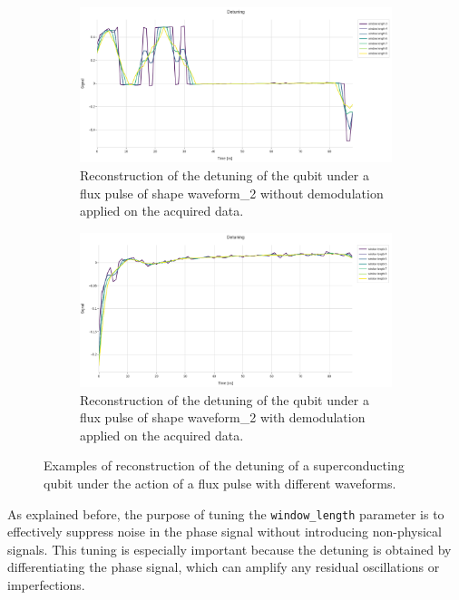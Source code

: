 \begin{figure}[h!]
    \begin{subfigure}[t]{0.45\textwidth}
        \includegraphics[width=\textwidth]{figures/png/Cryoscope/no_demod/long/detuning_windows.png}
        \caption{Reconstruction of the detuning of the qubit under a flux pulse of shape waveform\_2 without demodulation applied on the acquired data.}
        \label{fig:detuning:long_no_dem}
    \end{subfigure}
    \hfill
    \begin{subfigure}[t]{0.45\textwidth}
        \includegraphics[width=\textwidth]{figures/png/Cryoscope/demodulation/long/detuning_windows.png}
        \caption{Reconstruction of the detuning of the qubit under a flux pulse of shape waveform\_2 with demodulation applied on the acquired data.}
        \label{fig:detuning:long_dem}
    \end{subfigure}

    \caption{Examples of reconstruction of the detuning of a superconducting qubit under the action of a flux pulse with different waveforms.}
    \label{fig:detuning}
\end{figure}

As explained before, the purpose of tuning the \texttt{window\_length} parameter is to effectively suppress noise in the phase signal without introducing non-physical signals. 
This tuning is especially important because the detuning is obtained by differentiating the phase signal, which can amplify any residual oscillations or imperfections.

